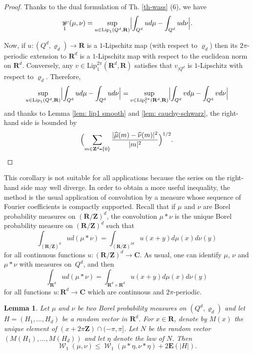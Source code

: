 \documentclass[12pt]{amsart}
\renewcommand{\mathcal}{\mathscr}
\def\setminus{\mathchoice
	{\mathbin{\vrule height .62ex width 1.61ex depth -.38ex}}%
	{\mathbin{\vrule height .62ex width 1.61ex depth -.38ex}}%
	{\mathbin{\vrule height .50ex width 0.85ex depth -.28ex}}%
	{\mathbin{\vrule height .20ex width 0.570ex depth -.24ex}}%
}
\newcommand{\Cc}{\mathbf{C}}
\newcommand{\Zz}{\mathbf{Z}}
\newcommand{\Rr}{\mathbf{R}}
\newcommand{\expect}{\mathbf{E}}
\renewcommand{\hat}{\widehat}
\DeclareMathOperator{\wass}{\mathcal{W}}
\renewcommand{\rho}{\varrho}
\theoremstyle{plain}
\newtheorem{lemma}[theorem]{Lemma}
\theoremstyle{remark}
\theoremstyle{definition}
\begin{document}
\begin{proof}
  Thanks to the dual formulation of Th. \ref{th-wass} (6), we have
  $$
  \wass_1(\mu,\nu) = \sup_{u \in \mathrm{Lip}_1(Q^d, \Rr)}\Bigl|
  \int_{Q^d} u d \mu - \int_{Q^d} u d \nu \Bigr|.
  $$
  
  Now, if $u \colon (Q^d, \rho_d) \to \Rr$ is a $1$-Lipschitz map
  (with respect to $\rho_d$) then its $2\pi$-periodic extension to
  $\Rr^d$ is a $1$-Lipschitz map with respect to the euclidean norm on
  $\Rr^d$. Conversely, any $v \in \mathrm{Lip}^{2\pi}_1(\Rr^d, \Rr)$
  satisfies that $v_{|Q^d}$ is $1$-Lipschitz with respect to $\rho_d$.
  Therefore,
  $$
  \sup_{u \in \mathrm{Lip}_1(Q^d, \Rr)}\Bigl| \int_{Q^d} u d
  \mu - \int_{Q^d} u d \nu \Bigr| = \sup_{v \in
    \mathrm{Lip}^{2\pi}_1(\Rr^d, \Rr)} \Bigl|\int_{Q^d} v d
  \mu - \int_{Q^d} v d \nu \Bigr|
  $$
  and thanks to Lemma \ref{lem: lip1 smooth} and \ref{lem:
    cauchy-schwarz}, the right-hand side is bounded by
  $$
  \Bigl(\sum_{m \in \Zz^d \setminus \{0\}}^{} \frac{|\hat{\mu}(m) -
    \hat{\nu}(m)|^2}{|m|^2}\Bigr)^{1/2}.
  $$
\end{proof}

This corollary is not suitable for all applications because the series
on the right-hand side may well diverge. In order to obtain a more
useful inequality, the method is the usual application of convolution
by a measure whose sequence of Fourier coefficients is compactly
supported. Recall that if $\mu$ and $\nu$ are Borel probability
measures on $(\Rr/\Zz)^d$, the convolution $\mu * \nu$ is the unique
Borel probability measure on $(\Rr/\Zz)^d$ such that
$$
\int_{(\Rr/\Zz)^d} u d(\mu * \nu) = \int_{(\Rr/\Zz)^{2d}}
u(x+y) d \mu(x) d\nu(y)
$$
for all continuous functions $u \colon (\Rr/\Zz)^d \to \Cc$. As usual,
one can identify $\mu$, $\nu$ and $\mu*\nu$ with measures on~$Q^d$,
and then
$$
\int_{\Rr^d} u d(\mu * \nu) = \int_{\Rr^d\times\Rr^d} u(x+y)
d \mu(x) d\nu(y)
$$
for all functions $u\colon \Rr^d\to\Cc$ which are continuous and
$2 \pi$-periodic.



\begin{lemma}\label{lem: regularization cost}
  Let $\mu$ and $\nu$ be two Borel probability measures on
  $(Q^d, \rho_d)$ and let $H = (H_1, \dots, H_d)$ be a random vector
  in $\Rr^d$. For $x \in \Rr$, denote by $M(x)$ the unique element of
  $(x + 2 \pi \Zz)\cap(-\pi, \pi]$. Let $N$ be the random vector
  $(M(H_1), \dots, M(H_d))$ and let $\eta$ denote the law of $N$. Then
  $$
  \wass_1(\mu, \nu) \leqslant 	\wass_1(\mu* \eta, \nu * \eta) + 2 \expect(|H|).
  $$
\end{lemma}
\end{document}
